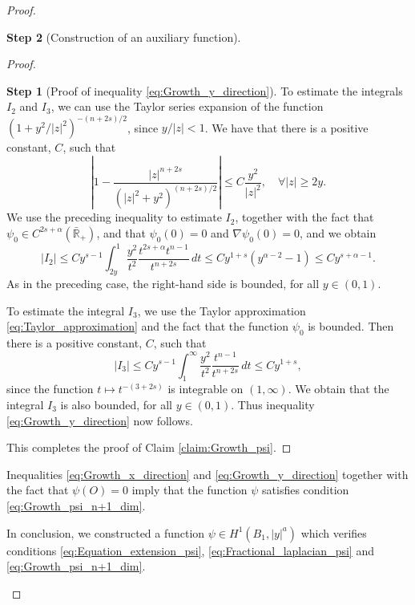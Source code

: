 \documentclass[11pt,reqno]{amsart}
\theoremstyle{definition}
\newtheorem{step}{Step}
\theoremstyle{remark}
\begin{document}
\begin{proof}
\begin{step}[Construction of an auxiliary function]
\begin{proof}
\begin{step}[Proof of inequality \eqref{eq:Growth_y_direction}]
To estimate the integrals $I_2$ and $I_3$, we can use the Taylor series expansion of the function $(1+y^2/|z|^2)^{-(n+2s)/2}$, since $y/|z| <1$. We have that there is a positive constant, $C$, such that 
\begin{equation}
\label{eq:Taylor_approximation}
\left|1-\frac{|z|^{n+2s}}{\left(|z|^2+y^2\right)^{(n+2s)/2}}\right| \leq C\frac{y^2}{|z|^2},\quad\forall |z|\geq 2y.
\end{equation}
We use the preceding inequality to estimate $I_2$, together with the fact that $\psi_0\in C^{2s+\alpha}(\bar{\mathbb{R}}_+)$, and that $\psi_0(0)=0$ and $\nabla\psi_0(0)=0$, and we obtain
$$
|I_2| \leq Cy^{s-1}\int_{2y}^1 \frac{y^2}{t^2} \frac{t^{2s+\alpha} t^{n-1}}{t^{n+2s}}\, dt \leq C y^{1+s}(y^{\alpha-2}-1) \leq C y^{s+\alpha-1}.
$$
As in the preceding case, the right-hand side is bounded, for all $y\in (0,1)$.

To estimate the integral $I_3$, we use the Taylor approximation \eqref{eq:Taylor_approximation} and the fact that the function $\psi_0$ is bounded. Then there is a positive constant, $C$, such that
$$
|I_3| \leq C y^{s-1} \int_{1}^{\infty} \frac{y^2}{t^2} \frac{t^{n-1}}{t^{n+2s}}\, dt \leq C y^{1+s},
$$
since the function $t\mapsto t^{-(3+2s)}$ is integrable on $(1,\infty)$. We obtain that the integral $I_3$ is also bounded, for all $y\in (0,1)$. Thus inequality \eqref{eq:Growth_y_direction} now follows.

\end{step}
This completes the proof of Claim \ref{claim:Growth_psi}.
\end{proof}
Inequalities \eqref{eq:Growth_x_direction} and \eqref{eq:Growth_y_direction} together with the fact that $\psi(O)=0$ imply that the function $\psi$ satisfies condition \eqref{eq:Growth_psi_n+1_dim}.

In conclusion, we constructed a function $\psi\in H^1(B_1, |y|^a)$ which verifies conditions \eqref{eq:Equation_extension_psi}, \eqref{eq:Fractional_laplacian_psi} and \eqref{eq:Growth_psi_n+1_dim}.
\end{step}


\end{proof}
\end{document}
